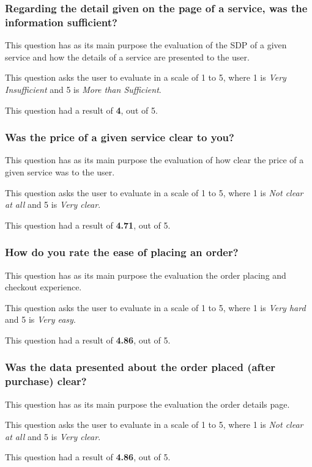 \subsubsection{Regarding the detail given on the page of a service, was the information sufficient?}

This question has as its main purpose the evaluation of the \gls{SDP} of a given service and how the details of a service are presented to the user. 
\par
This question asks the user to evaluate in a scale of 1 to 5, where 1 is \textit{Very Insufficient} and 5 is \textit{More than Sufficient}. 
\par
This question had a result of \textbf{4}, out of 5. 

\subsubsection{Was the price of a given service clear to you?}

This question has as its main purpose the evaluation of how clear the price of a given service was to the user.
\par
This question asks the user to evaluate in a scale of 1 to 5, where 1 is \textit{Not clear at all} and 5 is \textit{Very clear}. 
\par
This question had a result of \textbf{4.71}, out of 5. 

\subsubsection{How do you rate the ease of placing an order?}

This question has as its main purpose the evaluation the order placing and checkout experience. 
\par
This question asks the user to evaluate in a scale of 1 to 5, where 1 is \textit{Very hard} and 5 is \textit{Very easy}. 
\par
This question had a result of \textbf{4.86}, out of 5. 

\subsubsection{Was the data presented about the order placed (after purchase) clear?}

This question has as its main purpose the evaluation the order details page. 
\par 
This question asks the user to evaluate in a scale of 1 to 5, where 1 is \textit{Not clear at all} and 5 is \textit{Very clear}. 
\par
This question had a result of \textbf{4.86}, out of 5.

